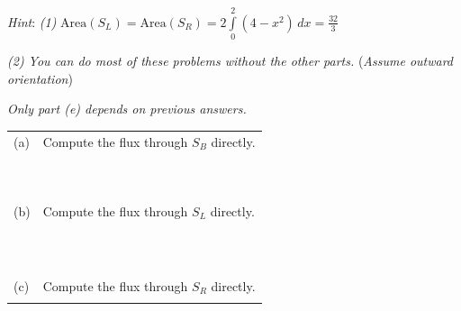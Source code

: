 \documentclass[12pt]{amsart}
\numberwithin{equation}{section}
\begin{document}
{{\em Hint}: {\it (1)} ${\text{Area}(S_L) = \text{Area}(S_R) = 2\int \limits_{0}^{2} (4-x^2) \, dx = \frac{32}{3}}$

\hspace{1.0cm} {\it (2) You can do most of these problems without the other parts.} \hspace{1.4cm} ({\em Assume outward orientation}) 

\hspace{1.6cm} {\it Only part (e) depends on previous answers.} 

\vspace{0.2cm}

{\setlength{\extrarowheight}{0.1cm}
\begin{tabular}{p{0.35cm}p{20.6cm}}
	(a) & Compute the flux through $S_B$ directly.\\
	&\\&\\&\\&\\&\\&\\&\\&\\&\\&\\
	(b) & Compute the flux through $S_L$ directly. \\
	&\\&\\&\\&\\&\\&\\&\\&\\&\\&\\&\\
	(c) & Compute the flux through $S_R$ directly. \\
	&\\
\end{tabular}}

\thispagestyle{empty}
\newpage
\thispagestyle{empty}

}
\end{document}
